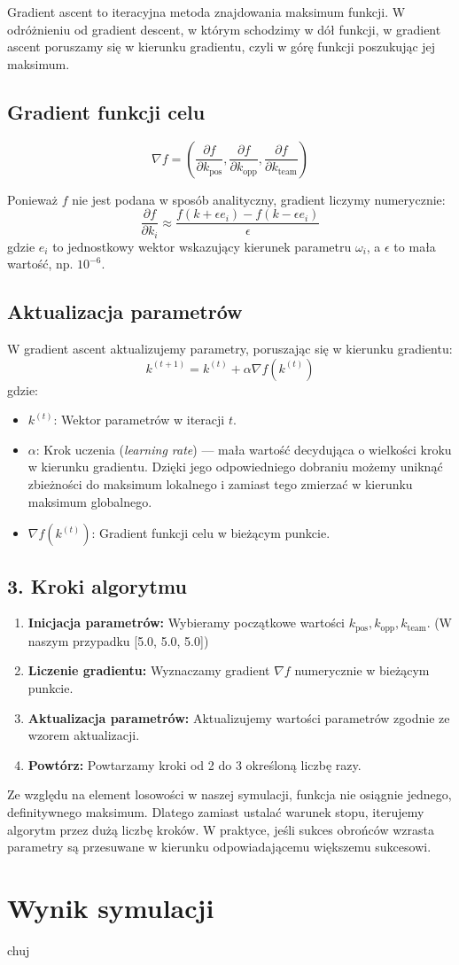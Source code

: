 \documentclass{article}
\begin{document}
Gradient ascent to iteracyjna metoda znajdowania maksimum funkcji. W odróżnieniu od gradient descent, w którym schodzimy w dół funkcji, w gradient ascent poruszamy się w kierunku gradientu, czyli w górę funkcji poszukując jej maksimum.

\subsection*{Gradient funkcji celu}

\[
\nabla f = \left( \frac{\partial f}{\partial k_{\text{pos}}}, \frac{\partial f}{\partial k_{\text{opp}}}, \frac{\partial f}{\partial k_{\text{team}}} \right)
\]

Ponieważ \(f\) nie jest podana w sposób analityczny, gradient liczymy numerycznie:
\[
\frac{\partial f}{\partial k_i} \approx \frac{f(k + \epsilon e_i) - f(k - \epsilon e_i)}{\epsilon}
\]
gdzie \(e_i\) to jednostkowy wektor wskazujący kierunek parametru \(\omega_i\), a \(\epsilon\) to mała wartość, np. \(10^{-6}\).

\subsection*{Aktualizacja parametrów}
W gradient ascent aktualizujemy parametry, poruszając się w kierunku gradientu:
\[
k^{(t+1)} = k^{(t)} + \alpha \nabla f(k^{(t)})
\]
gdzie:
\begin{itemize}
    \item \(k^{(t)}\): Wektor parametrów w iteracji \(t\).
    \item \(\alpha\): Krok uczenia (\textit{learning rate}) — mała wartość decydująca o wielkości kroku w kierunku gradientu. Dzięki jego odpowiedniego dobraniu możemy uniknąć zbieżności do maksimum lokalnego i zamiast tego zmierzać w kierunku maksimum globalnego.
    \item \(\nabla f(k^{(t)})\): Gradient funkcji celu w bieżącym punkcie.
\end{itemize}

\subsection*{3. Kroki algorytmu}
\begin{enumerate}
    \item \textbf{Inicjacja parametrów:} Wybieramy początkowe wartości \(k_{\text{pos}}, k_{\text{opp}}, k_{\text{team}}\). (W naszym przypadku [5.0, 5.0, 5.0])
    \item \textbf{Liczenie gradientu:} Wyznaczamy gradient \(\nabla f\) numerycznie w bieżącym punkcie.
    \item \textbf{Aktualizacja parametrów:} Aktualizujemy wartości parametrów zgodnie ze wzorem aktualizacji.
    \item \textbf{Powtórz:} Powtarzamy kroki od 2 do 3 określoną liczbę razy.
\end{enumerate}
Ze względu na element losowości w naszej symulacji, funkcja nie osiągnie jednego, definitywnego maksimum. Dlatego zamiast ustalać warunek stopu, iterujemy algorytm przez dużą liczbę kroków. W praktyce, jeśli sukces obrońców wzrasta parametry są przesuwane w kierunku odpowiadającemu większemu sukcesowi.


\section*{Wynik symulacji}
chuj
\end{document}
